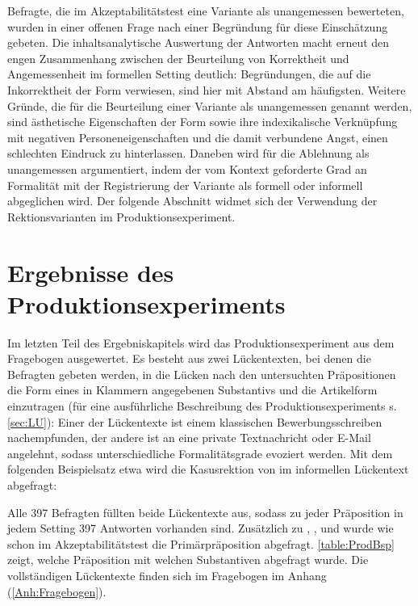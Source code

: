 Befragte, die im Akzeptabilitätstest eine Variante als unangemessen bewerteten, wurden in einer offenen Frage nach einer Begründung für diese Einschätzung gebeten. 
Die inhaltsanalytische Auswertung der Antworten macht erneut den engen Zusammenhang zwischen der Beurteilung von Korrektheit und Angemessenheit im formellen Setting deutlich:
Begründungen, die auf die Inkorrektheit der Form verwiesen, sind hier mit Abstand am häufigsten. 
Weitere Gründe, die für die Beurteilung einer Variante als unangemessen genannt werden, sind ästhetische Eigenschaften der Form sowie ihre indexikalische Verknüpfung mit negativen Personeneigenschaften und die damit verbundene Angst, einen schlechten Eindruck zu hinterlassen. 
Daneben wird für die Ablehnung als unangemessen argumentiert, indem der vom Kontext geforderte Grad an Formalität mit der Registrierung der Variante als formell oder informell abgeglichen wird. 
Der folgende Abschnitt widmet sich der Verwendung der Rektionsvarianten im Produktionsexperiment.  \section{Ergebnisse des Produktionsexperiments}
\label{sec:ErgProduktion}
Im letzten Teil des Ergebniskapitels wird das Produktionsexperiment aus dem Fragebogen ausgewertet. 
Es besteht aus zwei Lückentexten, bei denen die Befragten gebeten werden, in die Lücken nach den untersuchten Präpositionen die Form eines in Klammern angegebenen Substantivs und die Artikelform einzutragen (für eine ausführliche Beschreibung des Produktionsexperiments s. \autoref{sec:LU}):
Einer der Lückentexte ist einem klassischen Bewerbungsschreiben nachempfunden, der andere ist an eine private Textnachricht oder E-Mail angelehnt, sodass unterschiedliche Formalitätsgrade evoziert werden. 
Mit dem folgenden Beispielsatz etwa wird die Kasusrektion von \wegen{} im informellen Lückentext abgefragt:
\begin{exe}
\ex {}
\end{exe} 
Alle 397 Befragten füllten beide Lückentexte aus, sodass zu jeder Präposition in jedem Setting 397 Antworten vorhanden sind. 
Zusätzlich zu \wegen, \waehrend, \dank{} und \gegenueber{} wurde wie schon im Akzeptabilitätstest die Primärpräposition  abgefragt. 
\autoref{table:ProdBsp} zeigt, welche Präposition mit welchen Substantiven abgefragt wurde.  
Die vollständigen Lückentexte finden sich im Fragebogen im Anhang (\autoref{Anh:Fragebogen}).
